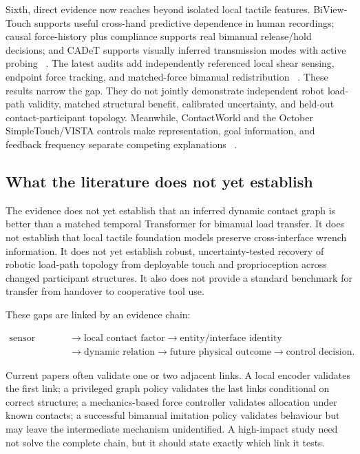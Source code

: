 Sixth, direct evidence now reaches beyond isolated local tactile features.
BiView-Touch supports useful cross-hand predictive dependence in human recordings;
causal force-history plus compliance supports real bimanual release/hold decisions;
and CADeT supports visually inferred transmission modes with active probing
~\cite{liang2026biviewtouch,marra2026temporaltactilehandover,hu2026cadet}.
The latest audits add independently referenced local shear sensing, endpoint
force tracking, and matched-force bimanual redistribution
~\cite{update2026vectile,update2026flore,update2026keepingcontact}.
These results narrow the gap. They do not jointly demonstrate independent robot
load-path validity, matched structural benefit, calibrated uncertainty, and
held-out contact-participant topology. Meanwhile, ContactWorld and the October
SimpleTouch/VISTA controls make representation, goal information, and feedback
frequency separate competing explanations
~\cite{zhang2026contactworld,yang2026simpletouch,wong2026vista}.

\subsection{What the literature does not yet establish}

The evidence does not yet establish that an inferred dynamic contact graph is
better than a matched temporal Transformer for bimanual load transfer. It does not
establish that local tactile foundation models preserve cross-interface wrench
information. It does not yet establish robust, uncertainty-tested recovery of robotic
load-path topology from deployable touch and proprioception across changed
participant structures. It also does not provide a
standard benchmark for transfer from handover to cooperative tool use.

These gaps are linked by an evidence chain:

\begin{equation}
\begin{aligned}
\text{sensor signal} &\rightarrow \text{local contact factor}
\rightarrow \text{entity/interface identity}\\
&\rightarrow \text{dynamic relation}
\rightarrow \text{future physical outcome}
\rightarrow \text{control decision}.
\end{aligned}
\label{eq:evidence_chain}
\end{equation}

Current papers often validate one or two adjacent links. A local encoder validates
the first link; a privileged graph policy validates the last links conditional on
correct structure; a mechanics-based force controller validates allocation under
known contacts; a successful bimanual imitation policy validates behaviour but
may leave the intermediate mechanism unidentified. A high-impact study need not
solve the complete chain, but it should state exactly which link it tests.

